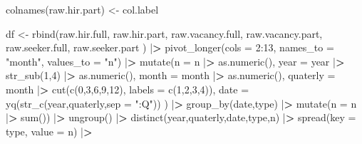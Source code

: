 \documentclass[
]{book}
\newenvironment{Shaded}{\begin{snugshade}}{\end{snugshade}}
\newcommand{\AttributeTok}[1]{\textcolor[rgb]{0.77,0.63,0.00}{#1}}
\newcommand{\DecValTok}[1]{\textcolor[rgb]{0.00,0.00,0.81}{#1}}
\newcommand{\ErrorTok}[1]{\textcolor[rgb]{0.64,0.00,0.00}{\textbf{#1}}}
\newcommand{\FunctionTok}[1]{\textcolor[rgb]{0.00,0.00,0.00}{#1}}
\newcommand{\NormalTok}[1]{#1}
\newcommand{\OtherTok}[1]{\textcolor[rgb]{0.56,0.35,0.01}{#1}}
\newcommand{\SpecialCharTok}[1]{\textcolor[rgb]{0.00,0.00,0.00}{#1}}
\newcommand{\StringTok}[1]{\textcolor[rgb]{0.31,0.60,0.02}{#1}}
\begin{document}
\begin{Shaded}
\begin{Highlighting}[]
\FunctionTok{colnames}\NormalTok{(raw.hir.part) }\OtherTok{\textless{}{-}}\NormalTok{ col.label}

\NormalTok{df }\OtherTok{\textless{}{-}}
  \FunctionTok{rbind}\NormalTok{(raw.hir.full,}
\NormalTok{        raw.hir.part,}
\NormalTok{        raw.vacancy.full,}
\NormalTok{        raw.vacancy.part,}
\NormalTok{        raw.seeker.full,}
\NormalTok{        raw.seeker.part}
\NormalTok{        ) }\SpecialCharTok{|}\ErrorTok{\textgreater{}} 
  \FunctionTok{pivot\_longer}\NormalTok{(}\AttributeTok{cols =} \DecValTok{2}\SpecialCharTok{:}\DecValTok{13}\NormalTok{,}
               \AttributeTok{names\_to =} \StringTok{"month"}\NormalTok{,}
               \AttributeTok{values\_to =} \StringTok{"n"}\NormalTok{) }\SpecialCharTok{|}\ErrorTok{\textgreater{}} 
  \FunctionTok{mutate}\NormalTok{(}\AttributeTok{n =}\NormalTok{ n }\SpecialCharTok{|}\ErrorTok{\textgreater{}} \FunctionTok{as.numeric}\NormalTok{(),}
         \AttributeTok{year =}\NormalTok{ year }\SpecialCharTok{|}\ErrorTok{\textgreater{}} \FunctionTok{str\_sub}\NormalTok{(}\DecValTok{1}\NormalTok{,}\DecValTok{4}\NormalTok{) }\SpecialCharTok{|}\ErrorTok{\textgreater{}} \FunctionTok{as.numeric}\NormalTok{(),}
         \AttributeTok{month =}\NormalTok{ month }\SpecialCharTok{|}\ErrorTok{\textgreater{}} \FunctionTok{as.numeric}\NormalTok{(),}
         \AttributeTok{quaterly =}\NormalTok{ month }\SpecialCharTok{|}\ErrorTok{\textgreater{}} \FunctionTok{cut}\NormalTok{(}\FunctionTok{c}\NormalTok{(}\DecValTok{0}\NormalTok{,}\DecValTok{3}\NormalTok{,}\DecValTok{6}\NormalTok{,}\DecValTok{9}\NormalTok{,}\DecValTok{12}\NormalTok{), }\AttributeTok{labels =} \FunctionTok{c}\NormalTok{(}\DecValTok{1}\NormalTok{,}\DecValTok{2}\NormalTok{,}\DecValTok{3}\NormalTok{,}\DecValTok{4}\NormalTok{)),}
         \AttributeTok{date =} \FunctionTok{yq}\NormalTok{(}\FunctionTok{str\_c}\NormalTok{(year,quaterly,}\AttributeTok{sep =} \StringTok{":Q"}\NormalTok{))}
\NormalTok{         ) }\SpecialCharTok{|}\ErrorTok{\textgreater{}} 
  \FunctionTok{group\_by}\NormalTok{(date,type) }\SpecialCharTok{|}\ErrorTok{\textgreater{}} 
  \FunctionTok{mutate}\NormalTok{(}\AttributeTok{n =}\NormalTok{ n }\SpecialCharTok{|}\ErrorTok{\textgreater{}} \FunctionTok{sum}\NormalTok{()) }\SpecialCharTok{|}\ErrorTok{\textgreater{}} 
  \FunctionTok{ungroup}\NormalTok{() }\SpecialCharTok{|}\ErrorTok{\textgreater{}} 
  \FunctionTok{distinct}\NormalTok{(year,quaterly,date,type,n) }\SpecialCharTok{|}\ErrorTok{\textgreater{}} 
  \FunctionTok{spread}\NormalTok{(}\AttributeTok{key =}\NormalTok{ type, }\AttributeTok{value =}\NormalTok{ n) }\SpecialCharTok{|}\ErrorTok{\textgreater{}} 

\end{Highlighting}
\end{Shaded}
\end{document}
